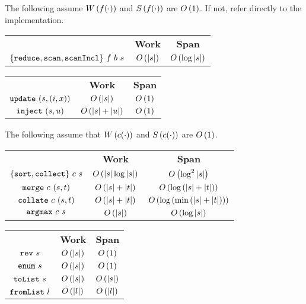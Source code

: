 \begin{costspec}
The following assume $W\left({f(\cdot)}\right)$ and $S\left({f(\cdot)}\right)$ are $O\left({1}\right)$. If not,
refer directly to the implementation.
\begin{tabular}{c|c|c}
& \textbf{Work} & \textbf{Span} \\
%
$\{\texttt{reduce},\texttt{scan},\texttt{scanIncl}\}~f~b~s$ &
$\displaystyle O\left({|s|}\right)$ &
$\displaystyle O\left({\log{|s|}}\right)$
%
\end{tabular}
\end{costspec}

\begin{costspec}[Updates]

\begin{tabular}{c|c|c}
& \textbf{Work} & \textbf{Span} \\
%
$\texttt{update}~(s,(i,x))$ &
$O\left({|s|}\right)$ &
$O\left({1}\right)$ \\
%
$\texttt{inject}~(s,u)$ &
$O\left({|s| + |u|}\right)$ &
$O\left({1}\right)$ \\
%
\end{tabular}
\end{costspec}

\begin{costspec}
The following assume that $W\left({c(\cdot)}\right)$ and $S\left({c(\cdot)}\right)$ are $O\left({1}\right)$.
\begin{tabular}{c|c|c}
& \textbf{Work} & \textbf{Span} \\
%
$\{\texttt{sort},\texttt{collect}\}~c~s$ &
$\displaystyle O\left({|s|\log{|s|}}\right)$ &
$\displaystyle O\left({\log^2{|s|}}\right)$ \\
%
$\texttt{merge}~c~(s,t)$ &
$\displaystyle O\left({|s| + |t|}\right)$ &
$\displaystyle O\left({\log\left(|s| + |t|\right)}\right)$ \\
%
$\texttt{collate}~c~(s,t)$ &
$\displaystyle O\left({|s| + |t|}\right)$ &
$\displaystyle O\left({\log\left(\min\left(|s| + |t|\right)\right)}\right)$ \\
%
$\texttt{argmax}~c~s$ &
$\displaystyle O\left({|s|}\right)$ &
$\displaystyle O\left({\log{|s|}}\right)$ \\
%
\end{tabular}
\end{costspec}

\begin{costspec}[Miscellaneous]

\begin{tabular}{c|c|c}
& \textbf{Work} & \textbf{Span} \\
%
$\texttt{rev}~s$ &
$\displaystyle O\left({|s|}\right)$ &
$\displaystyle O\left({1}\right)$ \\
%
$\texttt{enum}~s$ &
$\displaystyle O\left({|s|}\right)$ &
$\displaystyle O\left({1}\right)$ \\
%
$\texttt{toList}~s$ &
$O\left({|s|}\right)$ &
$O\left({|s|}\right)$ \\
%
$\texttt{fromList}~l$ &
$O\left({|l|}\right)$ &
$O\left({|l|}\right)$ \\
%
\end{tabular}
\end{costspec}


